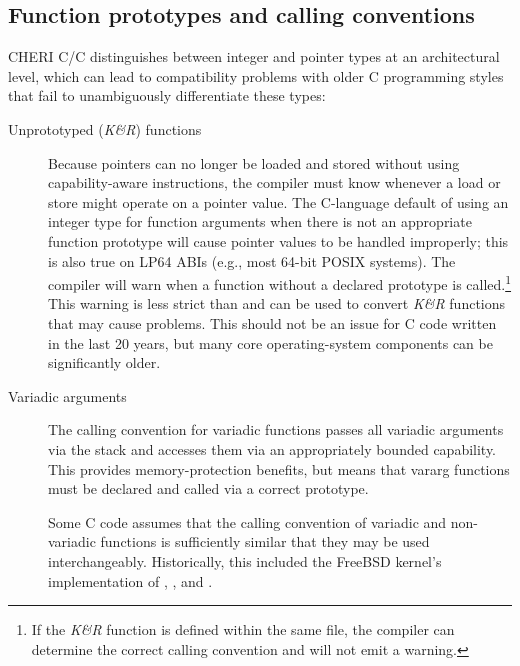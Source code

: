 \documentclass[12pt,twoside,openright,usletter]{article}
\newcommand{\ccode}[1]{{\small\ttfamily{#1}}}
\newcommand{\cfunc}[1]{{\ccode{#1()}}}
\newcommand{\commandline}[1]{{\ccode{#1}}}
\newcommand{\note}[2]{{\color{blue}[ Note: #1 - #2]}}
\renewcommand{\note}[2]{\relax\ifhmode\unskip\fi}
\newcommand{\arnote}[1]{\note{#1}{Alex R.}}
\newcommand{\rwnote}[1]{\note{#1}{Robert W.}}
\newcommand*{\cpp}[1][]{C\textsmaller[2]{\nolinebreak[4]\hspace{-.05em}\raisebox{.45ex}{\textbf{++}}}}
\begin{document}
\subsection{Function prototypes and calling conventions}

CHERI C/\cpp{} distinguishes between integer and pointer types at an
architectural level, which can lead to compatibility problems with older C
programming styles that fail to unambiguously differentiate these types:

\begin{description}
\item[Unprototyped (\textit{K\&R}) functions] Because pointers can no longer
  be loaded and stored without using capability-aware instructions, the
  compiler must know whenever a load or store might operate on a pointer
  value.
  The C-language default of using an integer type for function arguments when
  there is not an appropriate function prototype will cause pointer values to
  be handled improperly; this is also true on LP64 ABIs (e.g., most 64-bit
  POSIX systems).
  The compiler will warn when a function without a declared prototype is
  called.\footnote{If the \textit{K\&R} function is defined within the same
  file, the compiler can determine the correct calling convention and will not
  emit a warning.}
  This warning is less strict than \commandline{-Wstrict-prototypes} and can be
  used to convert \textit{K\&R} functions that may cause problems.
  This should not be an issue for C code written in the last 20 years, but
  many core operating-system components can be significantly older.

\item[Variadic arguments] The calling convention for variadic functions
  passes all variadic arguments via the stack and accesses them via an
  appropriately bounded capability.
  This provides memory-protection benefits, but means that vararg functions
  must be declared and called via a correct prototype.

  Some C code assumes that the calling convention of variadic and non-variadic
  functions is sufficiently similar that they may be used interchangeably.
  Historically, this included the FreeBSD kernel's implementation of
  \cfunc{open}, \cfunc{fcntl}, and \cfunc{syscall}.

  \rwnote{I wonder if we need to be more specific with an example here.}\arnote{TODO: Add example such as missing open() mode arguments?}

\end{description}
\end{document}
